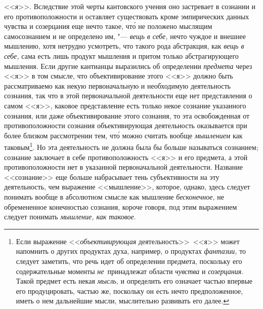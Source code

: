 <<{\em я}>>. Вследствие этой черты кантовского учения оно
застревает в сознании и его противоположности и оставляет существовать
кроме эмпирических данных чувства и созерцания еще нечто такое, чт\'{о} не
положено мыслящим самосознанием и не определено им, "---
{\em вещь в себе,} нечто чуждое и внешнее мышлению,
хотя нетрудно усмотреть, что такого рода абстракция, как
{\em вещь в себе,} сама есть лишь продукт мышления и
притом только абстрагирующего мышления. Если другие
кантианцы
выразились об определении {\em предмета} через <<я>> в
том смысле, что объективирование этого <<я>> должно быть рассматриваемо как
некую первоначальную и необходимую деятельность сознания, так что в этой
первоначальной деятельности еще нет представления о самом <<я>>, каковое
представление есть только некое сознание указанного сознания, или даже
объективирование этого сознания, то эта освобожденная от противоположности
сознания объективирующая деятельность оказывается при более близком
рассмотрении тем, чт\'{о} можно считать вообще {\em мышлением} как
таковым\footnote{Если выражение <<{\em объективирующая} деятельность>>~<<я>>
может напомнить о других продуктах духа, например, о продуктах
{\em фантазии,} то следует заметить, что речь идет об
определении предмета, поскольку его содержательные моменты
{\em не}~принадлежат области {\em чувства} и
{\em созерцания}. Такой предмет есть некая
{\em мысль,} и определить его означает частью впервые его
продуцировать, частью же, поскольку он есть нечто предположенное, иметь о
нем дальнейшие мысли, мыслительно развивать его далее.}. Но эта деятельность
не должна была бы больше называться сознанием; сознание заключает в себе
противоположность <<я>> и его предмета, а этой противоположности нет в
указанной первоначальной деятельности. Название <<сознание>> еще больше
набрасывает тень субъективности на эту деятельность, чем выражение
<<мышление>>,
которое, однако, здесь следует понимать вообще в абсолютном смысле как
мышление {\em бесконечное,} не обремененное конечностью
сознания, короче говоря, под этим выражением следует понимать
{\em мышление, как таковое}.

